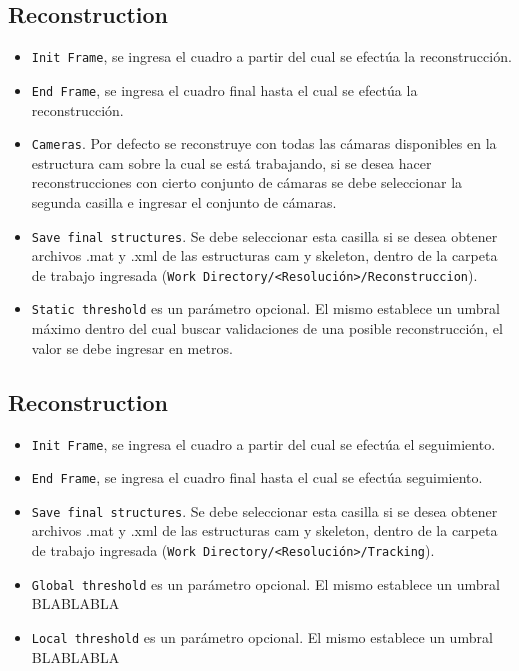  \subsection{Reconstruction}
 \begin{itemize}
    \item \texttt{Init Frame}, se ingresa el cuadro a partir del cual se efectúa la reconstrucción. 
    \item \texttt{End Frame}, se ingresa el cuadro final hasta el cual se efectúa la reconstrucción. 
    \item \texttt{Cameras}. Por defecto se reconstruye con todas las cámaras disponibles en la estructura cam sobre la cual se está trabajando, si se desea hacer reconstrucciones con cierto conjunto de cámaras se debe seleccionar la segunda casilla e ingresar el conjunto de cámaras.
    \item \texttt{Save final structures}. Se debe seleccionar esta casilla si se desea obtener archivos .mat y .xml de las estructuras  cam y skeleton, dentro de la carpeta  de trabajo ingresada (\texttt{Work Directory/<Resolución>/Reconstruccion}).
    \item \texttt{Static threshold} es un parámetro opcional. El mismo establece un umbral máximo dentro del cual buscar validaciones de una posible  reconstrucción, el valor se debe ingresar en metros.
   \end{itemize}
 
  \subsection{Reconstruction}
  \begin{itemize}
     \item \texttt{Init Frame}, se ingresa el cuadro a partir del cual se efectúa el seguimiento. 
     \item \texttt{End Frame}, se ingresa el cuadro final hasta el cual se efectúa seguimiento.      
     \item \texttt{Save final structures}. Se debe seleccionar esta casilla si se desea obtener archivos .mat y .xml de las estructuras  cam y skeleton, dentro de la carpeta  de trabajo ingresada (\texttt{Work Directory/<Resolución>/Tracking}).
     \item \texttt{Global threshold} es un parámetro opcional. El mismo establece un umbral BLABLABLA
     \item \texttt{Local threshold} es un parámetro opcional. El mismo establece un umbral BLABLABLA
   \end{itemize}
   
